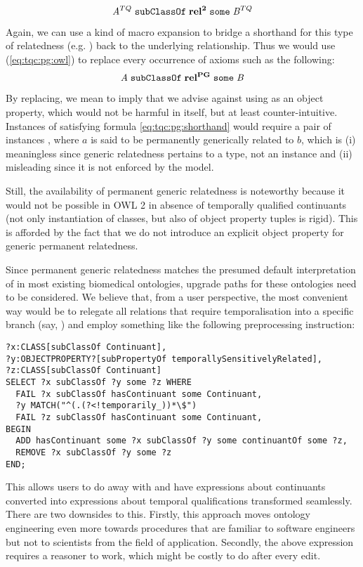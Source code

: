 \begin{equation}
\mathit{A}^{TQ}\;\mathtt{subClassOf}\;\mathrm{\mathbf{rel^2}}\;\mathtt{some}\;\mathit{B}^{TQ}
\label{eq:tqc:pg:owl}
\end{equation}

Again, we can use a kind of macro expansion to bridge a shorthand for this type
of relatedness (e.g. ) back to the
underlying relationship. Thus we would use (\ref{eq:tqc:pg:owl}) to replace
every occurrence of axioms such as the following:
\begin{equation}
\mathit{A}\;\mathtt{subClassOf}\;\mathrm{\mathbf{rel^{PG}}}\;\mathtt{some}\;\mathit{B}  
\label{eq:tqc:pg:shorthand}
\end{equation}

By replacing, we mean to imply that we advise against using  as an
object property, which would not be harmful in itself, but at least
counter-intuitive. Instances of  satisfying
formula \ref{eq:tqc:pg:shorthand} would require a pair of instances , where
$a$ is said to be permanently generically related to $b$, which is (i)
meaningless since generic relatedness pertains to a type, not an instance and
(ii) misleading since it is not enforced by the model.

Still, the availability of permanent generic relatedness is noteworthy because
it would not be possible in OWL 2 in absence of temporally qualified
continuants (not only instantiation of classes, but also of object property
tuples is rigid). This is afforded by the fact that we do not introduce an
explicit object property for generic permanent relatedness.

Since permanent generic relatedness matches the presumed default interpretation
of  in most existing biomedical ontologies, upgrade paths for these
ontologies need to be considered. We believe that, from a user perspective, the
most convenient way would be to relegate all relations that require
temporalisation into a specific branch (say,
) and employ something like the following
preprocessing instruction:
\begin{lstlisting}
?x:CLASS[subClassOf Continuant],
?y:OBJECTPROPERTY?[subPropertyOf temporallySensitivelyRelated],
?z:CLASS[subClassOf Continuant]
SELECT ?x subClassOf ?y some ?z WHERE
  FAIL ?x subClassOf hasContinuant some Continuant,
  ?y MATCH("^(.(?<!temporarily_))*\$")
  FAIL ?z subClassOf hasContinuant some Continuant,
BEGIN
  ADD hasContinuant some ?x subClassOf ?y some continuantOf some ?z,
  REMOVE ?x subClassOf ?y some ?z
END;
\end{lstlisting}
This allows users to do away with  and have expressions about
continuants converted into expressions about temporal qualifications transformed
seamlessly. There are two downsides to this. Firstly, this approach moves
ontology engineering even more towards procedures that are familiar to
software engineers but not to scientists from the field of application.
Secondly, the above expression requires a reasoner to work, which might be
costly to do after every edit.

